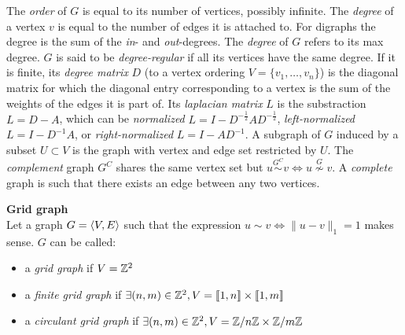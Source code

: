 The \emph{order} of $G$ is equal to its number of vertices, possibly infinite.
The \emph{degree} of a vertex $v$ is equal to the number of edges it is attached to.
For digraphs the degree is the sum of the \emph{in}- and \emph{out}-degrees.
The \emph{degree} of $G$ refers to its max degree.
$G$ is said to be \emph{degree-regular} if all its vertices have the same degree.
If it is finite, its \emph{degree matrix} $D$ (\wrt to a vertex ordering $V = \{v_1, \ldots, v_n\}$) is the diagonal matrix for which the diagonal entry corresponding to a vertex is the sum of the weights of the edges it is part of.
Its \emph{laplacian matrix} $L$ is the substraction $L = D-A$, which can be \emph{normalized} $L = I - D^{-\frac{1}2}AD^{-\frac{1}2}$, \emph{left-normalized} $L = I - D^{-1}A$, or \emph{right-normalized} $L = I - AD^{-1}$.
A subgraph of $G$ induced by a subset $U \subset V$ is the graph with vertex and edge set restricted by $U$. The \emph{complement} graph $G^C$ shares the same vertex set but $u \overset{G^C}\sim v \Leftrightarrow u \overset{G}\nsim v$.
A \emph{complete} graph is such that there exists an edge between any two vertices.



\begin{definition}\textbf{Grid graph}\\
Let a graph $G = \langle V, E \rangle$ such that the expression $u \sim v \Leftrightarrow \|u-v\|_1 = 1$ makes sense. $G$ can be called:
\begin{itemize}[nolistsep,noitemsep]
\item a \emph{grid graph} if $V = \mathbb{Z}^2$
\item a \emph{finite grid graph} if $\exists (n,m) \in \mathbb{Z}^2, V = \llbracket 1, n \rrbracket \times \llbracket 1, m \rrbracket$
\item a \emph{circulant grid graph} if $\exists (n,m) \in \mathbb{Z}^2, V = \mathbb{Z} /n \mathbb{Z} \times \mathbb{Z} /m \mathbb{Z}$
\end{itemize}
\end{definition}

